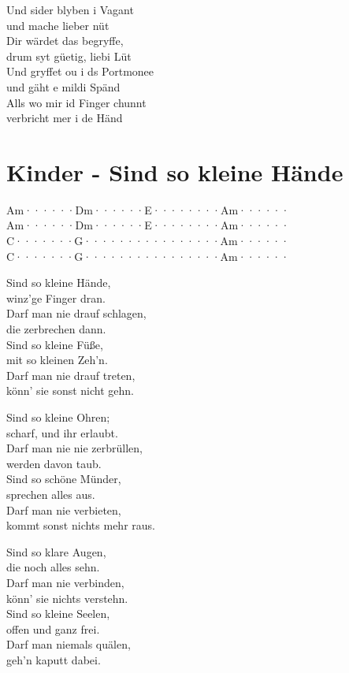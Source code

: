 \documentclass[
  letterpaper,
  twoside=false]{scrbook}
\begin{document}
Und sider blyben i Vagant\\
und mache lieber nüt\\
Dir wärdet das begryffe,\\
drum syt güetig, liebi Lüt\\
Und gryffet ou i ds Portmonee\\
und gäht e mildi Spänd\\
Alls wo mir id Finger chunnt\\
verbricht mer i de Händ

\hypertarget{kinder---sind-so-kleine-huxe4nde}{%
\chapter{Kinder - Sind so kleine
Hände}\label{kinder---sind-so-kleine-huxe4nde}}

Am······\textbar Dm······\textbar E········\textbar Am······\textbar{}\\
Am······\textbar Dm······\textbar E········\textbar Am······\textbar{}\\
C·······\textbar G·······\textbar·········\textbar Am······\textbar{}\\
C·······\textbar G·······\textbar·········\textbar Am······\textbar{}

Sind so kleine Hände,\\
winz'ge Finger dran.\\
Darf man nie drauf schlagen,\\
die zerbrechen dann.\\
Sind so kleine Füße,\\
mit so kleinen Zeh'n.\\
Darf man nie drauf treten,\\
könn' sie sonst nicht gehn.

Sind so kleine Ohren;\\
scharf, und ihr erlaubt.\\
Darf man nie nie zerbrüllen,\\
werden davon taub.\\
Sind so schöne Münder,\\
sprechen alles aus.\\
Darf man nie verbieten,\\
kommt sonst nichts mehr raus.

Sind so klare Augen,\\
die noch alles sehn.\\
Darf man nie verbinden,\\
könn' sie nichts verstehn.\\
Sind so kleine Seelen,\\
offen und ganz frei.\\
Darf man niemals quälen,\\
geh'n kaputt dabei.
\end{document}
